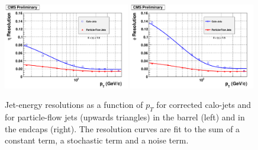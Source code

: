 \begin{figure}
\begin{center}
\includegraphics[width=0.49\textwidth]{Reconstruction/Figure_009-a-rotated90.pdf}
\includegraphics[width=0.49\textwidth]{Reconstruction/Figure_009-b-rotated90.pdf}
\caption{Jet-energy resolutions as a function of $p_T$ for corrected calo-jets and for particle-flow jets (upwards triangles) in the barrel (left) and in the endcaps (right). The resolution curves are fit to the sum of a constant term, a stochastic term and a noise term.~\cite{particleflow}}
\label{fig:jet_response_pt}
\end{center}
\end{figure}



